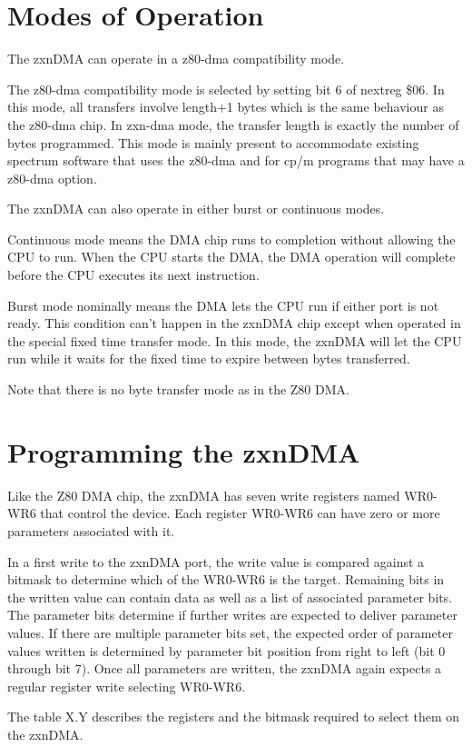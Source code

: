 \begin{multicols}{2}
\section{Modes of Operation}
The zxnDMA can operate in a z80-dma compatibility mode.

The z80-dma compatibility mode is selected by setting bit 6 of nextreg
\$06. In this mode, all transfers involve length+1 bytes which is the
same behaviour as the z80-dma chip. In zxn-dma mode, the transfer
length is exactly the number of bytes programmed. This mode is mainly
present to accommodate existing spectrum software that uses the
z80-dma and for cp/m programs that may have a z80-dma option.

The zxnDMA can also operate in either burst or continuous modes.

Continuous mode means the DMA chip runs to completion without allowing
the CPU to run. When the CPU starts the DMA, the DMA operation will
complete before the CPU executes its next instruction.

Burst mode nominally means the DMA lets the CPU run if either port is
not ready. This condition can't happen in the zxnDMA chip except when
operated in the special fixed time transfer mode. In this mode, the
zxnDMA will let the CPU run while it waits for the fixed time to
expire between bytes transferred.

Note that there is no byte transfer mode as in the Z80 DMA.

\section{Programming the zxnDMA}
Like the Z80 DMA chip, the zxnDMA has seven write registers named
WR0-WR6 that control the device. Each register WR0-WR6 can have zero
or more parameters associated with it.

In a first write to the zxnDMA port, the write value is compared
against a bitmask to determine which of the WR0-WR6 is the
target. Remaining bits in the written value can contain data as well
as a list of associated parameter bits. The parameter bits determine
if further writes are expected to deliver parameter values. If there
are multiple parameter bits set, the expected order of parameter
values written is determined by parameter bit position from right to
left (bit 0 through bit 7). Once all parameters are written, the
zxnDMA again expects a regular register write selecting WR0-WR6.

The table X.Y describes the registers and the bitmask required to
select them on the zxnDMA.


\end{multicols}
